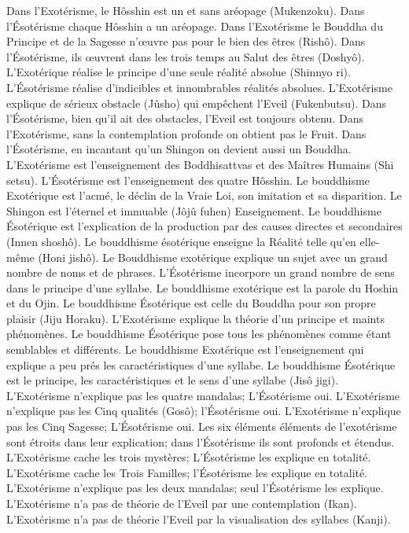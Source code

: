 Dans l’Exotérisme, le Hôsshin est un et sans aréopage (Mukenzoku).
Dans l’Ésotérisme chaque Hôsshin a un aréopage.
Dans l’Exotérisme le Bouddha du Principe et de la Sagesse n’œuvre pas pour le bien des êtres (Rishô).
Dans l’Ésotérisme, ils œuvrent dans les trois temps au Salut des êtres (Doshyô).
L’Exotérique réalise le principe d'une seule réalité absolue (Shinnyo ri).
L’Ésotérisme réalise d’indicibles et innombrables réalités absolues.
L’Exotérisme explique de sérieux obstacle (Jûsho) qui empêchent l’Eveil (Fukenbutsu).
Dans l’Ésotérisme, bien qu’il ait des obstacles, l’Eveil est toujours obtenu.
Dans l’Exotérisme, sans la contemplation profonde on obtient pas le Fruit.
Dans l’Ésotérisme, en incantant qu’un Shingon on devient aussi un Bouddha.
L’Exotérisme est l’enseignement des Boddhisattvas et des Maîtres Humains (Shi setsu).
L’Ésotérisme est l’enseignement des quatre Hôsshin.
Le bouddhisme Exotérique est l’acmé, le déclin de la Vraie Loi, son imitation et sa disparition.
Le Shingon est l’éternel et immuable (Jôjû fuhen) Enseignement.
Le bouddhisme Ésotérique est l’explication de la production par des causes directes et secondaires (Innen shoshô).
Le bouddhisme ésotérique enseigne la Réalité telle qu’en elle-même (Honi jishô).
Le Bouddhisme exotérique explique un sujet avec un grand nombre de noms et de phrases.
L’Ésotérisme incorpore un grand nombre de sens dans le principe d’une syllabe.
Le bouddhisme exotérique est la parole du Hoshin et du Ojin.
Le bouddhisme Ésotérique est celle du Bouddha pour son propre plaisir (Jiju Horaku).
L’Exotérisme explique la théorie d’un principe et maints phénomènes.
Le bouddhisme Ésotérique pose tous les phénomènes comme étant semblables et différents.
Le bouddhisme Exotérique est l’enseignement qui explique a peu prés les caractéristiques d’une syllabe.
Le bouddhisme Ésotérique est le principe, les caractéristiques et le sens d’une syllabe (Jisô jigi).
L’Exotérisme n’explique pas les quatre mandalas; L’Ésotérisme oui.
L’Exotérisme n’explique pas les Cinq qualités (Gosô); l’Ésotérisme oui.
L’Exotérisme n’explique pas les Cinq Sagesse; L’Ésotérisme oui.
Les six éléments éléments de l'exotérisme sont étroits dans leur explication; dans l'Ésotérisme ils sont profonds et étendus.
L’Exotérisme cache les trois mystères; L’Ésotérisme les explique en totalité.
L’Exotérisme cache les Trois Familles; l’Ésotérisme les explique en totalité.
L’Exotérisme n'explique pas les deux mandalas; seul l’Ésotérisme les explique.
L’Exotérisme n’a pas de théorie de l’Eveil par une contemplation (Ikan).
L’Exotérisme n’a pas de théorie l’Eveil par la visualisation des syllabes (Kanji).
